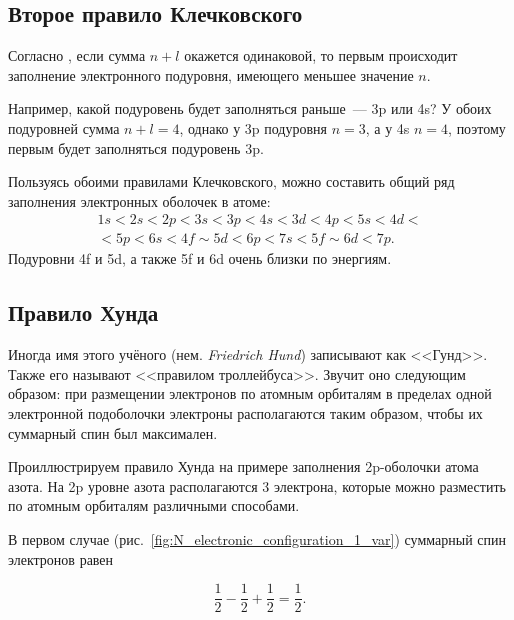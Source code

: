 \subsection*{Второе правило Клечковского}

Согласно , если сумма $n + l$ окажется одинаковой, то первым происходит заполнение электронного подуровня, имеющего меньшее значение $n$.

Например, какой подуровень будет заполняться раньше~--- 3p или 4s? У обоих подуровней сумма $n + l = 4$, однако у 3p подуровня $n = 3$, а у 4s $n = 4$, поэтому первым будет заполняться подуровень 3p.

Пользуясь обоими правилами Клечковского, можно составить общий ряд заполнения электронных оболочек в атоме:
\begin{equation*}
    \label{eq:sequence_of_filling_electronic_subshells}
    \begin{split}
        1s < 2s < 2p < 3s < 3p < 4s < 3d < 4p < 5s < 4d < \\
        < 5p < 6s < 4f \sim 5d < 6p < 7s < 5f \sim 6d < 7p.
    \end{split}
\end{equation*}
Подуровни 4f и 5d, а также 5f и 6d очень близки по энергиям.

\subsection*{\protect{} Правило Хунда}\label{term:hund_rule}

Иногда имя этого учёного (нем. \textit{Friedrich Hund}) записывают как <<Гунд>>. Также его называют <<правилом троллейбуса>>. Звучит оно следующим образом: при размещении электронов по атомным орбиталям в пределах одной электронной подоболочки электроны располагаются таким образом, чтобы их суммарный спин был максимален.

Проиллюстрируем правило Хунда на примере заполнения 2p-оболочки атома азота. На 2p уровне азота располагаются 3 электрона, которые можно разместить по атомным орбиталям различными способами.

В первом случае (рис.~\ref{fig:N_electronic_configuration_1_var}) суммарный спин электронов равен

\begin{equation*}
    \frac{1}{2} - \frac{1}{2} + \frac{1}{2} = \frac{1}{2}.
\end{equation*}

